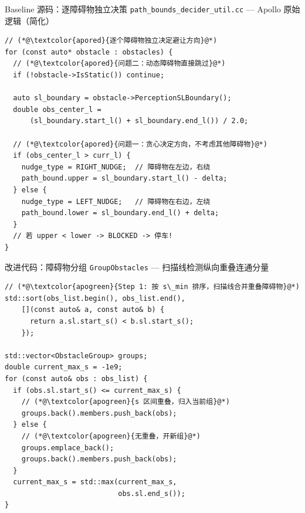 \documentclass[aspectratio=169,10pt,fontset=none]{ctexbeamer}
\begin{document}
\begin{frame}[fragile]{Baseline 源码：逐障碍物独立决策}
  \vspace{-0.2cm}
  {\small\texttt{path\_bounds\_decider\_util.cc} --- Apollo 原始逻辑（简化）}
  \vspace{0.1cm}
\begin{lstlisting}
// (*@\textcolor{apored}{逐个障碍物独立决定避让方向}@*)
for (const auto* obstacle : obstacles) {
  // (*@\textcolor{apored}{问题二：动态障碍物直接跳过}@*)
  if (!obstacle->IsStatic()) continue;

  auto sl_boundary = obstacle->PerceptionSLBoundary();
  double obs_center_l =
      (sl_boundary.start_l() + sl_boundary.end_l()) / 2.0;

  // (*@\textcolor{apored}{问题一：贪心决定方向，不考虑其他障碍物}@*)
  if (obs_center_l > curr_l) {
    nudge_type = RIGHT_NUDGE;  // 障碍物在左边，右绕
    path_bound.upper = sl_boundary.start_l() - delta;
  } else {
    nudge_type = LEFT_NUDGE;   // 障碍物在右边，左绕
    path_bound.lower = sl_boundary.end_l() + delta;
  }
  // 若 upper < lower -> BLOCKED -> 停车!
}
\end{lstlisting}
\end{frame}

\begin{frame}[fragile]{改进代码：障碍物分组}
  \vspace{-0.2cm}
  {\small\texttt{GroupObstacles} --- 扫描线检测纵向重叠连通分量}
  \vspace{0.1cm}
\begin{lstlisting}
// (*@\textcolor{apogreen}{Step 1: 按 s\_min 排序，扫描线合并重叠障碍物}@*)
std::sort(obs_list.begin(), obs_list.end(),
    [](const auto& a, const auto& b) {
      return a.sl.start_s() < b.sl.start_s();
    });

std::vector<ObstacleGroup> groups;
double current_max_s = -1e9;
for (const auto& obs : obs_list) {
  if (obs.sl.start_s() <= current_max_s) {
    // (*@\textcolor{apogreen}{s 区间重叠，归入当前组}@*)
    groups.back().members.push_back(obs);
  } else {
    // (*@\textcolor{apogreen}{无重叠，开新组}@*)
    groups.emplace_back();
    groups.back().members.push_back(obs);
  }
  current_max_s = std::max(current_max_s,
                           obs.sl.end_s());
}
\end{lstlisting}
\end{frame}
\end{document}
